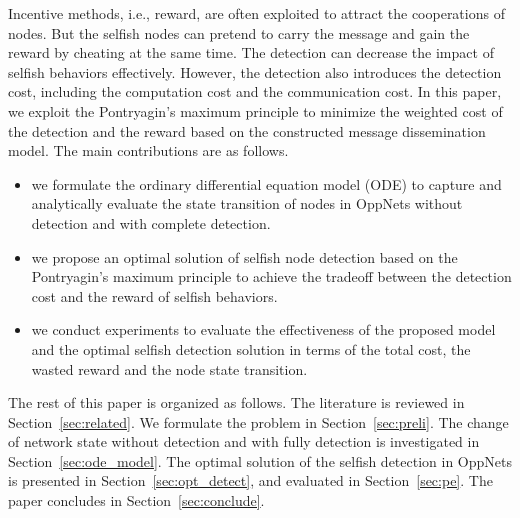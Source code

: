 Incentive methods, i.e., reward,
are often exploited to attract the cooperations of nodes.
But the selfish nodes can pretend to carry the message
and gain the reward by cheating at the same time.
The detection can decrease the impact of selfish behaviors effectively.
However, the detection also introduces the detection cost, 
including the computation cost and the communication cost.
In this paper, we exploit the Pontryagin's maximum principle to 
minimize the weighted cost of the detection and the reward
based on the constructed message dissemination model.
The main contributions are as follows.

\begin{itemize}
\item {we formulate the ordinary differential equation model (ODE)
to capture and analytically evaluate the state transition of nodes
in OppNets without detection and with complete detection.}
\item {we propose an optimal solution of selfish node detection
based on the Pontryagin's maximum principle
to achieve the tradeoff between the detection cost
and the reward of selfish behaviors.}
\item {we conduct experiments to evaluate
the effectiveness of the proposed model
and the optimal selfish detection solution
in terms of the total cost, the wasted reward and the node state transition.}
\end{itemize}

The rest of this paper is organized as follows.
The literature is reviewed in Section~\ref{sec:related}.
We formulate the problem in Section~\ref{sec:preli}.
The change of network state without detection and with fully detection
is investigated in Section~\ref{sec:ode_model}.
The optimal solution of the selfish detection in OppNets
is presented in Section~\ref{sec:opt_detect},
and evaluated in Section~\ref{sec:pe}.
The paper concludes in Section~\ref{sec:conclude}.
